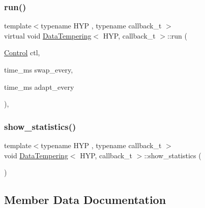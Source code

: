 \subsubsection{\texorpdfstring{run()}{run()}\hspace{0.1cm}{\footnotesize\ttfamily [2/2]}}
{\footnotesize\ttfamily template$<$typename H\+YP , typename callback\+\_\+t $>$ \\
virtual void \hyperlink{class_data_tempering}{Data\+Tempering}$<$ H\+YP, callback\+\_\+t $>$\+::run (\begin{DoxyParamCaption}\item[{\hyperlink{struct_control}{Control}}]{ctl,  }\item[{time\+\_\+ms}]{swap\+\_\+every,  }\item[{time\+\_\+ms}]{adapt\+\_\+every }\end{DoxyParamCaption})\hspace{0.3cm}{\ttfamily [inline]}, {\ttfamily [virtual]}}

\mbox{\label{class_data_tempering_a01d9f1eb405ed44f8151bd79afd2d0cc}} 
\subsubsection{\texorpdfstring{show\+\_\+statistics()}{show\_statistics()}}
{\footnotesize\ttfamily template$<$typename H\+YP , typename callback\+\_\+t $>$ \\
void \hyperlink{class_data_tempering}{Data\+Tempering}$<$ H\+YP, callback\+\_\+t $>$\+::show\+\_\+statistics (\begin{DoxyParamCaption}{ }\end{DoxyParamCaption})\hspace{0.3cm}{\ttfamily [inline]}}



\subsection{Member Data Documentation}
\mbox{\label{class_data_tempering_a1479c10bde08cccc9764267738e429eb}} 
